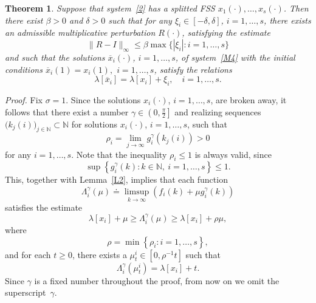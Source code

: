 \documentclass[10pt,a4paper]{amsart}
\theoremstyle{plain}
\newtheorem{theorem}{Theorem}[section]
\begin{document}
\setcounter{section}{5}
\setcounter{theorem}{0}
\setcounter{equation}{13}
\begin{theorem}
\it
\label{T6}Suppose that system~\eqref{2} has a splitted FSS 
$x_{1}(\cdot),\dots,x_{s}(\cdot)$. Then there exist $\beta>0$ and $\delta >0$ such
that for any $\xi_{i}\in [-\delta,\delta]$, $i=1,\dots ,s$,  there exists an admissible
multiplicative perturbation $R(\cdot )$, satisfying the estimate%
\begin{equation}
\| R-I\| _{\infty }\le \beta \max 
\bigl\{|\xi _{i}| \colon i=1,\dots ,s\bigr\}  
\label{X7}
\end{equation}%
and such that the solutions $\overline{x}_{i}(\cdot )$, $i=1,\ldots ,s$, of
system~\eqref{M4} with the initial conditions $\overline{x}_{i}(1)=x_{i}(1),$
$i=1,\dots ,s$, satisfy the relations%
\begin{equation*}
\lambda [ \overline{x}_{i}] =\lambda [ x_{i}]+\xi _{i},\quad i=1,\dots ,s.
\end{equation*}%
\end{theorem}

\emph{Proof.}
Fix $\sigma=1$. Since the solutions $x_{i}(\cdot )$, 
$i=1,\dots ,s$, are broken away, it follows that there exist a number 
$\gamma \in \left( 0,\frac{\pi }{2}\right] $ and realizing sequences 
$\bigl(k_{j}(i)\bigr)_{j\in \mathbb{N}}\subset \mathbb{N}$
for solutions $x_{i}(\cdot )$, $i=1,\dots ,s$, such that%
\begin{equation*}
\rho _{i}=\lim_{j\to \infty }g_{i}^{\gamma }( k_{j}(i)) >0
\end{equation*}%
for any $i=1,\dots ,s$. Note that the inequality $\rho _{i}\le 1$ is always
valid, since%
\begin{equation*}
\sup \left\{ g^{\gamma}_{i}(k)\colon k\in \mathbb{N},\ i=1,\dots ,s\right\} \le 1.
\end{equation*}%
This, together with Lemma~\ref{L2}, implies that each function 
\begin{equation*}
\Lambda _{i}^{\gamma }( \mu ) \doteq \limsup_{k\to \infty
}( f_{i}(k)+\mu g_{i}^{\gamma }(k))  
\end{equation*}%
satisfies the estimate%
\begin{equation}
\lambda [ x_{i}] +\mu \ge \Lambda _{i}^{\gamma }( \mu
) \ge \lambda [ x_{i}] +\rho \mu ,
\label{X2}
\end{equation}%
where%
\begin{equation*}
\rho =\min \left\{ \rho _{i}\colon i=1,\dots ,s\right\} ,
\end{equation*}%
and for each $t\ge 0$, there exists a $\mu _{t}^{i}\in [ 0,\rho ^{-1}t%
] $ such that%
\begin{equation}
\Lambda _{i}^{\gamma }( \mu _{t}^{i}) =\lambda [ x_{i}]
+t.  \label{X3}
\end{equation}%
Since $\gamma $ is a 
fixed number throughout the proof, from now on we omit the
superscript~$\gamma $.
\end{document}
